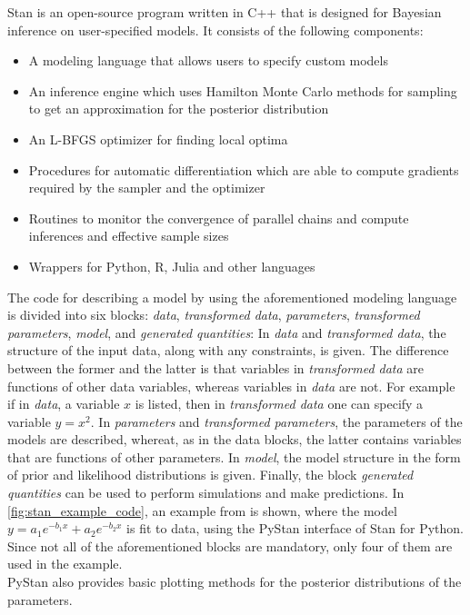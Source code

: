 \documentclass{article}
\begin{document}
Stan is an open-source program written in C++ that is designed for Bayesian inference on user-specified models. It consists of the following components:
\begin{itemize}
	\item A modeling language that allows users to specify custom models
	\item An inference engine which uses Hamilton Monte Carlo methods for sampling to get an approximation for the posterior distribution
	\item An L-BFGS optimizer for finding local optima
	\item Procedures for automatic differentiation which are able to compute gradients required by the sampler and the optimizer
	\item Routines to monitor the convergence of parallel chains and compute inferences and effective sample sizes
	\item Wrappers for Python, R, Julia and other languages
\end{itemize}
The code for describing a model by using the aforementioned modeling language is divided into six blocks: \textit{data}, \textit{transformed data}, \textit{parameters}, \textit{transformed parameters}, \textit{model}, and \textit{generated quantities}: In \textit{data} and \textit{transformed data}, the structure of the input data, along with any constraints, is given. The difference between the former and the latter is that variables in \textit{transformed data} are functions of other data variables, whereas variables in \textit{data} are not. For example if in \textit{data}, a variable $x$ is listed, then in \textit{transformed data} one can specify a variable $y=x^2$. In \textit{parameters} and \textit{transformed parameters}, the parameters of the models are described, whereat, as in the data blocks, the latter contains variables that are functions of other parameters. In \textit{model}, the model structure in the form of prior and likelihood distributions is given. Finally, the block \textit{generated quantities} can be used to perform simulations and make predictions. In \ref{fig:stan_example_code}, an example from \cite{Gelman_2015} is shown, where the model $y=a_1e^{-b_1x} + a_2e^{-b_2x}$ is fit to data, using the PyStan interface of Stan for Python. Since not all of the aforementioned blocks are mandatory, only four of them are used in the example.
\\
PyStan also provides basic plotting methods for the posterior distributions of the parameters.
\end{document}
